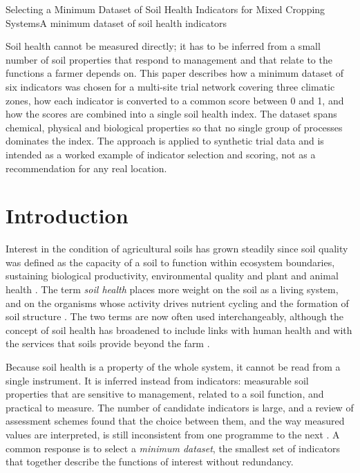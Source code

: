 \documentclass[../main.tex]{subfiles}
\begin{document}
\begin{paper}{Selecting a Minimum Dataset of Soil Health Indicators for Mixed Cropping Systems}{A minimum dataset of soil health indicators}
\label{paper:indicators}

\begin{paperabstract}
Soil health cannot be measured directly; it has to be inferred from a small
number of soil properties that respond to management and that relate to the
functions a farmer depends on. This paper describes how a minimum dataset of
six indicators was chosen for a multi-site trial network covering three
climatic zones, how each indicator is converted to a common score between 0
and 1, and how the scores are combined into a single soil health index. The
dataset spans chemical, physical and biological properties so that no single
group of processes dominates the index. The approach is applied to synthetic
trial data and is intended as a worked example of indicator selection and
scoring, not as a recommendation for any real location.
\end{paperabstract}

\section{Introduction}

Interest in the condition of agricultural soils has grown steadily since
soil quality was defined as the capacity of a soil to function within
ecosystem boundaries, sustaining biological productivity, environmental
quality and plant and animal health \parencite{karlen1997}. The term
\emph{soil health} places more weight on the soil as a living system, and on
the organisms whose activity drives nutrient cycling and the formation of
soil structure \parencite{doran2000}. The two terms are now often used
interchangeably, although the concept of soil health has broadened to include
links with human health and with the services that soils provide beyond the
farm \parencite{lehmann2020}.

Because soil health is a property of the whole system, it cannot be read from
a single instrument. It is inferred instead from indicators: measurable soil
properties that are sensitive to management, related to a soil function, and
practical to measure. The number of candidate indicators is large, and a
review of assessment schemes found that the choice between them, and the way
measured values are interpreted, is still inconsistent from one programme to
the next \parencite{bunemann2018}. A common response is to select a
\emph{minimum dataset}, the smallest set of indicators that together describe
the functions of interest without redundancy.


\end{paper}
\end{document}
